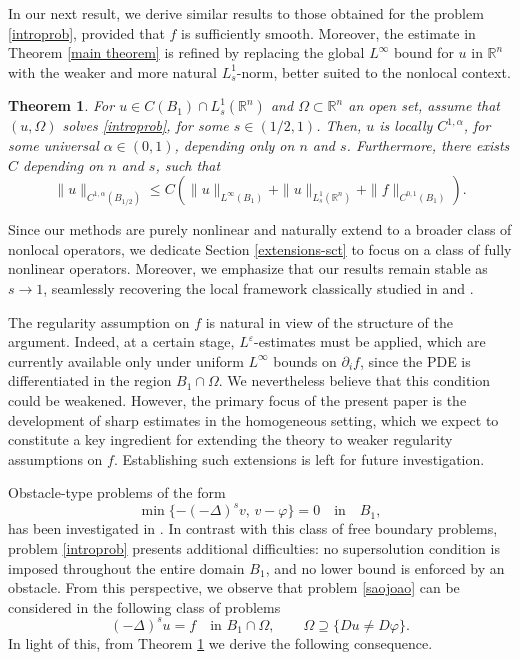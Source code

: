\documentclass[reqno,11pt]{amsart}
\newtheorem{theorem}{Theorem}[section]
\numberwithin{equation}{section}
\numberwithin{equation}{section}
\begin{document}
In our next result, we derive similar results to those obtained for the problem \eqref{introprob}, provided that $f$ is sufficiently smooth. Moreover, the estimate in Theorem \ref{main theorem} is refined by replacing the global $L^\infty$ bound for $u$ in $\mathbb{R}^n$ with the weaker and more natural $L^1_s$-norm, better suited to the nonlocal context.

\begin{theorem}\label{general theorem}
For $u \in C(B_1) \cap L^1_s(\mathbb{R}^n)$ and $\Omega \subset \mathbb{R}^n$ an open set, assume that $(u,\Omega)$ solves \eqref{introprob}, for some $s\in (1/2,1)$. Then, $u$ is locally $C^{1,\alpha}$, for some universal $\alpha \in (0,1)$, depending only on $n$ and $s$. Furthermore, there exists $C$ depending on $n$ and $s$, such that
$$
    \|u\|_{C^{1,\alpha}(B_{1/2})} \leq C\left(\|u\|_{L^\infty(B_1)} +  \|u\|_{L^1_s(\mathbb{R}^n)} + \|f\|_{C^{0,1}(B_1)} \right).
$$
\end{theorem}

Since our methods are purely nonlinear and naturally extend to a broader class of nonlocal operators, we dedicate Section \ref{extensions-sct} to focus on a class of fully nonlinear operators. Moreover, we emphasize that our results remain stable as \( s \to 1 \), seamlessly recovering the local framework classically studied in \cite{CS02} and \cite{CSS04}.


The regularity assumption on $f$ is natural in view of the structure of the argument. Indeed, at a certain stage, $L^{\varepsilon}$-estimates must be applied, which are currently available only under uniform $L^\infty$ bounds on $\partial_i f$, since the PDE is differentiated in the region $B_1 \cap \Omega$. We nevertheless believe that this condition could be weakened. However, the primary focus of the present paper is the development of sharp estimates in the homogeneous setting, which we expect to constitute a key ingredient for extending the theory to weaker regularity assumptions on $f$. Establishing such extensions is left for future investigation.

Obstacle-type problems of the form
\begin{equation}\label{saojoao}
\min\{-(-\Delta)^s v,\, v - \varphi \} = 0 \quad \text{in} \quad B_1,
\end{equation}
has been investigated in \cite{ARO20, BFRO18, JN17, CROS17}. In contrast with this class of free boundary problems, problem \eqref{introprob} presents additional difficulties: no supersolution condition is imposed throughout the entire domain $B_1$, and no lower bound is enforced by an obstacle. From this perspective, we observe that problem \eqref{saojoao} can be considered in the following class of problems
\begin{equation}\label{saopedro}
(-\Delta)^s u = f \quad \text{in } B_1 \cap \Omega, \qquad
\Omega \supseteq \{ Du \neq D\varphi \}.
\end{equation}
In light of this, from Theorem \ref{general theorem} we derive the following consequence.
\end{document}
